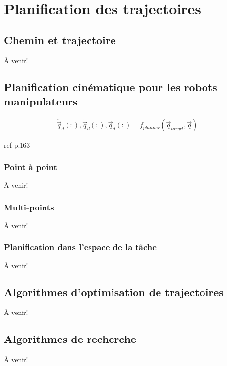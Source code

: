 \chapter{Planification des trajectoires}




\section{Chemin et trajectoire}
À venir!

\section{Planification cinématique pour les robots manipulateurs}

%
\begin{align}
  \ddot{\vec{q}}_d(:),\dot{\vec{q}}_d(:),\vec{q}_d(:) = f_{planner}(\vec{q}_{target}, \vec{q})
	\label{eq:trajgen}
\end{align}
%

ref p.163

\subsection{Point à point}
À venir!

\subsection{Multi-points}
À venir!



\subsection{Planification dans l'espace de la tâche}
À venir!



\section{Algorithmes d'optimisation de trajectoires}



À venir!

\section{Algorithmes de recherche}

À venir!
